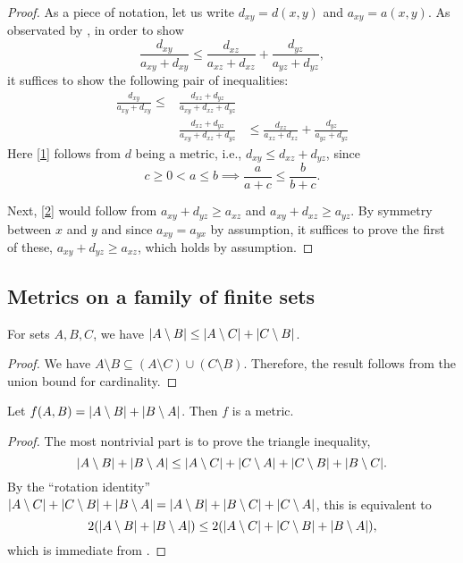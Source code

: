 		\begin{proof}
			As a piece of notation, let us write $d_{xy}=d(x,y)$ and $a_{xy}=a(x,y)$.
			As observated by \cite{210750}, in order to show
			\[
				\frac{d_{xy}}{a_{xy}+d_{xy}}\le  \frac{d_{xz}}{a_{xz}+d_{xz}} + \frac{d_{yz}}{a_{yz}+d_{yz}},
			\]
			it suffices to show the following pair of inequalities:
			\begin{eqnarray}
				\frac{d_{xy}}{a_{xy}+d_{xy}}\le &\frac{d_{xz}+d_{yz}}{a_{xy}+d_{xz}+d_{yz}}& \label{1}\\
				&\frac{d_{xz}+d_{yz}}{a_{xy}+d_{xz}+d_{yz}}& \le \frac{d_{xz}}{a_{xz}+d_{xz}} + \frac{d_{yz}}{a_{yz}+d_{yz}}\label{2}
			\end{eqnarray}
			Here \eqref{1} follows from $d$ being a metric, i.e., $d_{xy}\le d_{xz}+d_{yz}$, since
			\[
				c\ge 0<a\le b\implies \frac{a}{a+c}\le \frac{b}{b+c}.
			\]

			Next, \eqref{2} would follow from $a_{xy}+d_{yz}\ge a_{xz}$ and $a_{xy}+d_{xz}\ge a_{yz}$.
			By symmetry between $x$ and $y$ and since $a_{xy}=a_{yx}$ by assumption,
			it suffices to prove the first of these, $a_{xy}+d_{yz}\ge a_{xz}$, which holds by assumption.
		\end{proof}
        \subsection{Metrics on a family of finite sets}
        \begin{lemma}\label{union-bound}
            For sets $A,B,C$, we have
            $\lvert A\setminus B\rvert\le \lvert A\setminus C\rvert+\lvert C\setminus B\rvert$.
        \end{lemma}
        \begin{proof}
            We have $A\setminus B\subseteq (A\setminus C)\cup (C\setminus B)$. Therefore, the result follows from the union bound for cardinality.
        \end{proof}
        \begin{lemma}\label{jaccard-numerator}
             Let $f(A,B)=\lvert A\setminus B\rvert+\lvert B\setminus A\rvert$. Then $f$ is a metric.
        \end{lemma}
        \begin{proof}
            The most nontrivial part is to prove the triangle inequality,
			\[
			\lvert A\setminus B\rvert+\lvert B\setminus A\rvert\le
			\lvert A\setminus C\rvert+\lvert C\setminus A\rvert
			+
			\lvert C\setminus B\rvert+\lvert B\setminus C\rvert.
			\]
			By the ``rotation identity'' $\lvert A\setminus C\rvert+\lvert C\setminus B\rvert+\lvert B\setminus A\rvert=
			\lvert A\setminus B\rvert+\lvert B\setminus C\rvert+\lvert C\setminus A\rvert$, this is equivalent to
			\[
			2(\lvert A\setminus B\rvert+\lvert B\setminus A\rvert)\le
			2(\lvert A\setminus C\rvert
			+
			\lvert C\setminus B\rvert
			+
			\lvert B\setminus A\rvert),
			\]
			which is immediate from .
        \end{proof}

